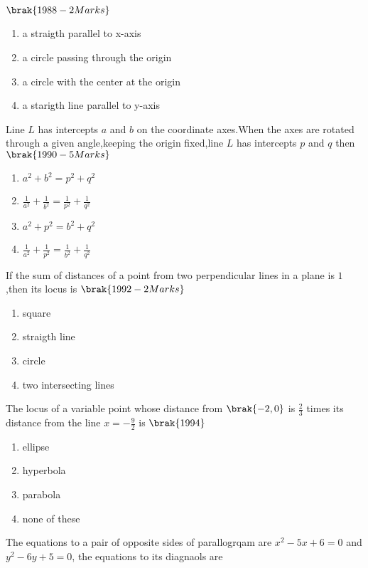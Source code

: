\hfill{$\brak{1988-2 Marks}$}
\begin{enumerate}
    \item a straigth parallel to x-axis
    \item a circle passing through the origin
    \item a circle with the center at the origin 
    \item a starigth line parallel to y-axis 
\end{enumerate}
\item Line $L$ has intercepts $a$ and $b$ on the coordinate axes.When the axes are rotated through a given angle,keeping the origin fixed,line $L$ has intercepts $p$ and $q$ then
\hfill{$\brak{1990-5 Marks}$}
\begin{enumerate}
    
    \item $a^2+b^2=p^2+q^2$
    \item $\frac{1}{a^2}+\frac{1}{b^2}=\frac{1}{p^2}+\frac{1}{q^2}$
    \item $a^2+p^2=b^2+q^2$
    \item $\frac{1}{a^2}+\frac{1}{p^2}=\frac{1}{b^2}+\frac{1}{q^2}$
    
\end{enumerate}
\item If the sum of distances of a point from two perpendicular lines in a plane is $1$,then its locus is
\hfill{$\brak{1992-2 Marks}$}
\begin{enumerate}
    
        \item square
        \item straigth line
        \item circle
        \item two intersecting lines
    
\end{enumerate}
\item The locus of a variable point whose distance from $\brak{-2,0}$ is $\frac{2}{3}$ times its distance from the line $x=-\frac{9}{2}$ is
\hfill{$\brak{1994}$}
\begin{enumerate}
    
       \item ellipse
       \item hyperbola
       \item parabola
       \item none of these
    
\end{enumerate}
\item The equations to a pair of opposite sides of parallogrqam are $x^2-5x+6=0$ and $y^2-6y+5=0$, the equations to its diagnaols are 
